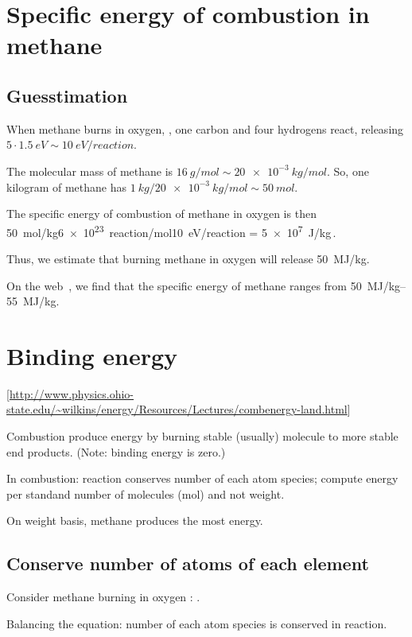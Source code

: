 \section*{Specific energy of combustion in methane}

\subsection*{Guesstimation}
%
When methane burns in oxygen, , one carbon and four hydrogens react, releasing $5\cdot\SI{1.5}{eV}\sim\SI{10}{eV/reaction}$. 

The molecular mass of methane is $\SI{16}{g/mol}\sim\SI{20e-3}{kg/mol}$. So, one kilogram of methane has $\SI{1}{kg}/\SI{20e-3}{kg/mol}\sim\SI{50}{mol}$.

The specific energy of combustion of methane in oxygen is then
%
\beq
    \SI{50}{mol/kg}\cdot\SI{6e23}{reaction/mol}\cdot\SI{10}{eV/reaction} = \SI{5e7}{J/kg}\,.
\eeq

Thus, we estimate that burning methane in oxygen will release \SI{50}{MJ/kg}.

On the web~, we find that the specific energy of methane ranges from \SIrange{50}{55}{MJ/kg}.


\section*{Binding energy}
%
[\url{http://www.physics.ohio-state.edu/~wilkins/energy/Resources/Lectures/combenergy-land.html}]

Combustion produce energy by burning stable (usually) molecule to more stable end products. (Note:  binding energy is zero.)

In combustion: reaction conserves number of each atom species; compute energy per standand number of molecules (mol) and not weight.

On weight basis, methane produces the most energy.


\subsection*{Conserve number of atoms of each element}
%
Consider methane  burning in oxygen : .

Balancing the equation: number of each atom species is conserved in reaction.

